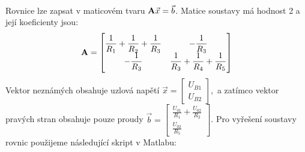 \begin{mdframed}[style=mdexam]
\begin{example}
\begin{subequations}
\begin{alignat}{2}
      \end{alignat}
    \end{subequations}  
    {\centering
    \captionsetup{type=figure}
    \label{teo:fig080}
    \par}
    Rovnice lze zapsat v maticovém tvaru \(\mathbf{A}\vec{x} = \vec{b}\). Matice soustavy má hodnost 2
    a její koeficienty jsou:
    \begin{equation*}
      \mathbf{A} = 
        \left[
          \begin{matrix}
            \dfrac{1}{R_1} +\dfrac{1}{R_2} + \dfrac{1}{R_3}  &  -\dfrac{1}{R_3}        \\
                           -\dfrac{1}{R_3}  &   \dfrac{1}{R_3} + \dfrac{1}{R_4} + \dfrac{1}{R_5}
          \end{matrix}
        \right]
    \end{equation*}
    Vektor neznámých obsahuje uzlová napětí \(\vec{x} = \left[\begin{matrix} U_{B1} \\ U_{B2}
    \end{matrix}\right],\) a zatímco vektor pravých stran obsahuje pouze proudy \(\vec{b} =
    \left[\begin{matrix} \frac{U_{01}}{R_1} + \frac{U_{02}}{R_2} \\ \frac{U_{02}}{R_5}
    \end{matrix}\right]\). Pro vyřešení soustavy rovnic použijeme následující skript v Matlabu:
  \end{example}
  
\end{mdframed}